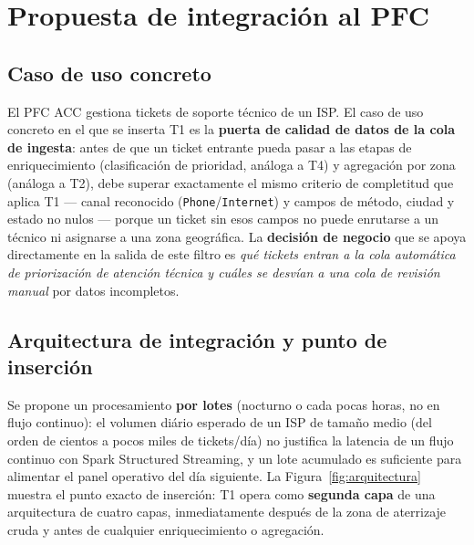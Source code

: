 \documentclass[11pt,a4paper]{article}
\begin{document}
\section{Propuesta de integraci\'on al PFC}
\label{sec:propuesta}

\subsection{Caso de uso concreto}

El PFC ACC gestiona tickets de soporte t\'ecnico de un ISP. El caso de uso concreto en el que
se inserta T1 es la \textbf{puerta de calidad de datos de la cola de ingesta}: antes de que un
ticket entrante pueda pasar a las etapas de enriquecimiento (clasificaci\'on de prioridad,
an\'aloga a T4) y agregaci\'on por zona (an\'aloga a T2), debe superar exactamente el mismo
criterio de completitud que aplica T1 --- canal reconocido (\texttt{Phone}/\texttt{Internet})
y campos de m\'etodo, ciudad y estado no nulos --- porque un ticket sin esos campos no puede
enrutarse a un t\'ecnico ni asignarse a una zona geogr\'afica. La \textbf{decisi\'on de
negocio} que se apoya directamente en la salida de este filtro es \textit{qu\'e tickets entran
a la cola autom\'atica de priorizaci\'on de atenci\'on t\'ecnica y cu\'ales se desv\'ian a una
cola de revisi\'on manual} por datos incompletos.

\subsection{Arquitectura de integraci\'on y punto de inserci\'on}

Se propone un procesamiento \textbf{por lotes} (nocturno o cada pocas horas, no en flujo
continuo): el volumen di\'ario esperado de un ISP de tama\~no medio (del orden de cientos a
pocos miles de tickets/d\'ia) no justifica la latencia de un flujo continuo con Spark
Structured Streaming, y un lote acumulado es suficiente para alimentar el panel operativo del
d\'ia siguiente. La Figura~\ref{fig:arquitectura} muestra el punto exacto de inserci\'on: T1
opera como \textbf{segunda capa} de una arquitectura de cuatro capas, inmediatamente despu\'es
de la zona de aterrizaje cruda y antes de cualquier enriquecimiento o agregaci\'on.
\end{document}
